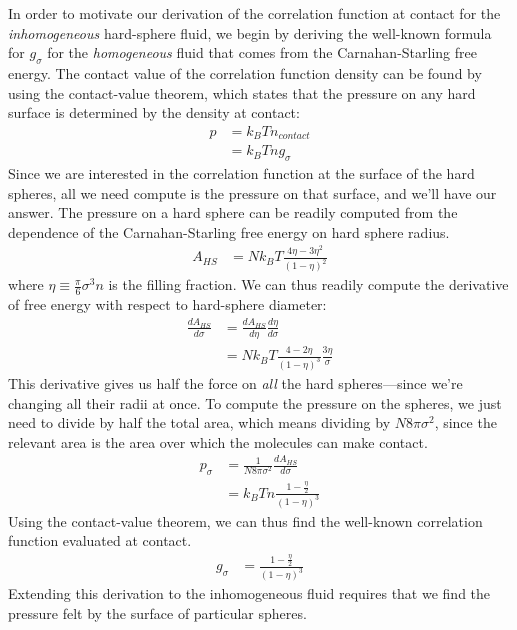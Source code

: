 \documentclass[letterpaper,twocolumn,amsmath,amssymb,jcp,10pt,aip]{revtex4-1}
\begin{document}
In order to motivate our derivation of the correlation function at
contact for the \emph{inhomogeneous} hard-sphere fluid, we begin by
deriving the well-known formula for $g_\sigma$ for the
\emph{homogeneous} fluid that comes from the Carnahan-Starling free
energy.  The contact value of the correlation function density can be
found by using the contact-value theorem, which states that the
pressure on any hard surface is determined by the density at contact:
\begin{align}
  p &= k_BT n_\textit{contact} \\
  &= k_BT n g_\sigma
\end{align}
Since we are interested in the correlation function at the surface of
the hard spheres, all we need compute is the pressure on that surface,
and we'll have our answer.  The pressure on a hard sphere can be
readily computed from the dependence of the Carnahan-Starling free
energy on hard sphere radius.
\begin{align}
  A_{HS} &= Nk_BT \frac{4\eta - 3\eta^2}{(1-\eta)^2}
\end{align}
where $\eta \equiv \frac{\pi}{6} \sigma^3 n$ is the filling fraction.
We can thus readily compute the derivative of free energy with respect
to hard-sphere diameter:
\begin{align}
  \frac{dA_{HS}}{d\sigma} &= \frac{dA_{HS}}{d\eta} \frac{d\eta}{d\sigma} \\
  &= Nk_BT \frac{4 - 2\eta}{(1-\eta)^3} \frac{3 \eta}{\sigma} \label{eq:dAhsdR}
\end{align}
This derivative gives us half the force on \emph{all} the hard
spheres---since we're changing all their radii at once.  To compute
the pressure on the spheres, we just need to divide by half the total
area, which means dividing by $N 8\pi \sigma^2$, since the relevant
area is the area over which the molecules can make contact.
\begin{align}
  p_\sigma &= \frac{1}{N 8\pi \sigma^2} \frac{dA_{HS}}{d\sigma} \\
  &= k_BT n \frac{1 - \frac{\eta}2}{(1-\eta)^3}
\end{align}
Using the contact-value theorem, we can thus find the well-known
correlation function evaluated at contact.
\begin{align}
  g_\sigma &= \frac{1 - \frac{\eta}2}{(1-\eta)^3} \label{eq:cs-g}
\end{align}
Extending this derivation to the inhomogeneous fluid requires that we
find the pressure felt by the surface of particular spheres.
\end{document}
